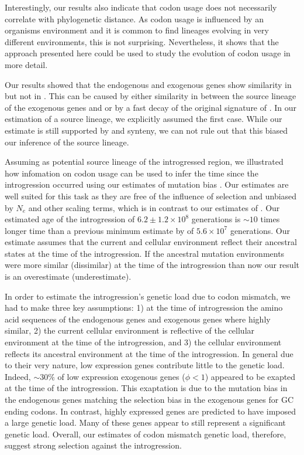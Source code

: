 \documentclass[fleqn,letterpaper]{article}
\begin{document}
Interestingly, our results also indicate that codon usage does not necessarily correlate with phylogenetic distance. 
As codon usage is influenced by an organisms environment and it is common to find lineages evolving in very different environments, this is not surprising.
Nevertheless, it shows that the approach presented here could be used to study the evolution of codon usage in more detail.

Our results showed that the endogenous and exogenous genes show similarity in \DE but not in \DM.
This can be caused by either similarity in \DE between the source lineage of the exogenous genes and \kluyveri or by a fast decay of the original signature of \DE.
In our estimation of a source lineage, we explicitly assumed the first case.
While our estimate is still supported by \GC and synteny, we can not rule out that this biased our inference of the source lineage.

Assuming \gossypii as potential source lineage of the introgressed region, we illustrated how infomation on codon usage can be used to infer the time since the introgression occurred using our estimates of mutation bias \DM.
Our \DM estimates are well suited for this task as they are free of the influence of selection and unbiased by $N_e$ and other scaling terms, which is in contrast to our estimates of \DE \citep{gilchrist2015}.
Our estimated age of the introgression of $6.2\pm1.2\times 10^8$ generations is $\sim 10$ times longer time than a previous minimum estimate by \citet{friedrich2015} of $5.6\times 10^7$ generations.
Our estimate assumes that the current \gossypii and \kluyveri cellular environment reflect their ancestral states at the time of the introgression.
If the ancestral mutation environments were more similar (dissimilar) at the time of the introgression than now our result is an overestimate (underestimate).

In order to estimate the introgression's genetic load due to codon mismatch, we had to make three key assumptions: 1) at the time of introgression the amino acid sequences of the endogenous genes and exogenous genes where highly similar, 2) the current \kluyveri cellular environment is reflective of the cellular environment at the time of the introgression, and 3) the \gossypii cellular environment reflects its ancestral environment at the time of the introgression.
In general due to their very nature, low expression genes contribute little to the genetic load.
Indeed, $\sim 30 \%$ of low expression exogenous genes ($\phi < 1$) appeared to be exapted at the time of the introgression.
This exaptation is due to the mutation bias in the endogenous genes matching the selection bias in the exogenous genes for GC ending codons.
In contrast, highly expressed genes are predicted to have imposed a large genetic load.
Many of these genes appear to still represent a significant genetic load.
Overall, our estimates of codon mismatch genetic load, therefore, suggest strong selection against the introgression.
\end{document}
